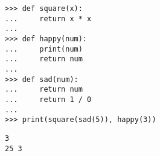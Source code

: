 \question \begin{lstlisting}
>>> def square(x):
...     return x * x
...
>>> def happy(num):
...     print(num)
...     return num
...
>>> def sad(num):
...     return num
...     return 1 / 0
...
>>> print(square(sad(5)), happy(3))
\end{lstlisting}

\begin{solution}[0.5in]
\begin{verbatim}
3
25 3
\end{verbatim}
\end{solution}